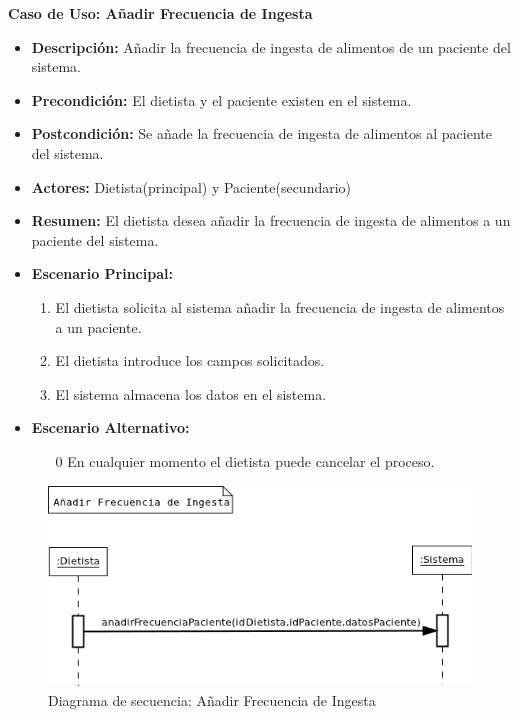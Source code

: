 \textbf{Caso de Uso: Añadir Frecuencia de Ingesta}
\begin{itemize}
\item \textbf{Descripción:} Añadir la frecuencia de ingesta de alimentos de un paciente del sistema.
\item \textbf{Precondición:} El dietista y el paciente existen en el sistema.
\item \textbf{Postcondición:} Se añade la frecuencia de ingesta de alimentos al paciente del sistema.
\item \textbf{Actores:} Dietista(principal) y Paciente(secundario)
\item \textbf{Resumen:} El dietista desea añadir la frecuencia de ingesta de alimentos a un paciente del sistema.
\item \textbf{Escenario Principal:}
\begin{enumerate}
\item El dietista solicita al sistema añadir la frecuencia de ingesta de alimentos a un paciente.
\item El dietista introduce los campos solicitados.
\item El sistema almacena los datos en el sistema.
\end{enumerate}
\item \textbf{Escenario Alternativo:}
\begin{enumerate}
\item[0] En cualquier momento el dietista puede cancelar el proceso.
\end{enumerate}
\end{itemize}
\begin{figure}[H]
  \label{ds_anadirfrecing}
  \begin{center}
    \includegraphics[scale=0.7]{../img/DS_AnadirFrecIng.png}
  \end{center}
  \caption{Diagrama de secuencia: Añadir Frecuencia de Ingesta}
\end{figure}
